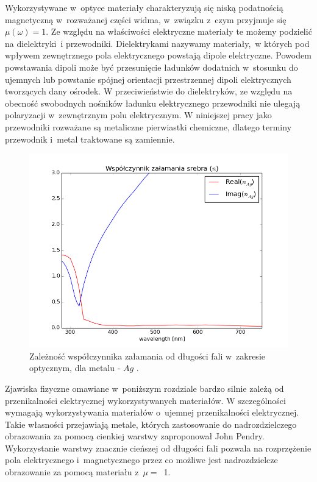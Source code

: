 Wykorzystywane w~optyce materiały charakteryzują się niską podatnością magnetyczną w~rozważanej części widma, w~związku z~czym przyjmuje się ${\mu(\omega)=1}$. Ze względu na właściwości elektryczne  materiały te możemy  podzielić na dielektryki~i przewodniki. Dielektrykami nazywamy materiały,~w których pod wpływem zewnętrznego pola elektrycznego powstają dipole elektryczne. Powodem powstawania dipoli może być przesunięcie ładunków dodatnich w~stosunku do ujemnych lub powstanie spójnej orientacji przestrzennej dipoli elektrycznych tworzących dany ośrodek. W przeciwieństwie do dielektryków, ze względu na obecność swobodnych nośników ładunku elektrycznego przewodniki nie ulegają polaryzacji w~zewnętrznym polu elektrycznym. W niniejszej pracy jako przewodniki rozważane są metaliczne pierwiastki chemiczne, dlatego terminy przewodnik i~metal traktowane są zamiennie.

\begin{figure}[tb]
	\includegraphics[width=\textwidth]{images/agn.png}
	\caption{Zależność współczynnika załamania od długości fali w~zakresie optycznym, dla metalu - $Ag$ \cite{PhysRevB.6.4370}.  }
	\label{fig:agn}
\end{figure}
Zjawiska fizyczne omawiane w~poniższym rozdziale bardzo silnie zależą od przenikalności elektrycznej wykorzystywanych materiałów. W szczególności wymagają wykorzystywania materiałów o~ujemnej przenikalności elektrycznej. Takie własności przejawiają metale, których zastosowanie do nadrozdzielczego obrazowania za pomocą cienkiej warstwy zaproponował John Pendry. Wykorzystanie warstwy znacznie cieńszej od długości fali pozwala na rozprzężenie pola elektrycznego i~magnetycznego przez co możliwe jest nadrozdzielcze obrazowanie za pomocą materiału z~$\mu=$~1\cite{PhysRevLett.85.3966}.

